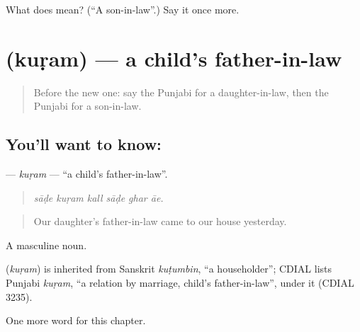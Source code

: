 \begin{tcolorbox}[breakable,colback=teal!4,colframe=teal!35!black,title={Before you move on}]
What does  mean? (\textquotedblleft{}A son-in-law\textquotedblright{}.) Say it once more.
\end{tcolorbox}
\section[\texorpdfstring{\pa{ਕੁੜਮ} (kuṛam)}{ਕੁੜਮ (kuṛam)}]{ (kuṛam) — a child's father-in-law}

\label{lesson:PA-C329-kuram}



\begin{quote}
Before the new one: say the Punjabi for a daughter-in-law, then the Punjabi for a son-in-law.
\end{quote}

\subsection*{You'll want to know: }
\textbf{} — \emph{kuṛam} — \textquotedblleft{}a child's father-in-law\textquotedblright{}.

\begin{quote}
     
\end{quote}

\begin{quote}
\emph{sāḍe kuṛam kall sāḍe ghar āe.}
\end{quote}

\begin{quote}
Our daughter's father-in-law came to our house yesterday.
\end{quote}

A masculine noun.

\begin{cousinweb}
\textbf{} (\emph{kuṛam}) is inherited from Sanskrit \emph{kuṭumbin}, \textquotedblleft{}a householder\textquotedblright{}; CDIAL lists Punjabi \emph{kuṛam}, \textquotedblleft{}a relation by marriage, child's father-in-law\textquotedblright{}, under it (CDIAL 3235).
\end{cousinweb}

\begin{grammarlens}[title={What you've built}]
One more word for this chapter.
\end{grammarlens}

